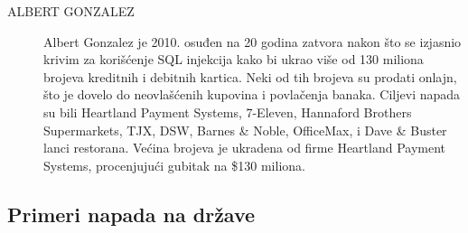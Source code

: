 \documentclass[a4paper]{article}
\theoremstyle{break}
\begin{document}
{\begin{description}
\item[ALBERT GONZALEZ] Albert Gonzalez je 2010. osuđen na 20 godina zatvora nakon što se izjasnio krivim za korišćenje SQL injekcija kako bi ukrao više od 130 miliona brojeva kreditnih i debitnih kartica. Neki od tih brojeva su prodati onlajn, što je dovelo do neovlašćenih kupovina i povlačenja banaka. Ciljevi napada su bili Heartland Payment Systems,  7-Eleven,  Hannaford Brothers Supermarkets,  TJX,  DSW,  Barnes \& Noble, OfficeMax, i Dave \& Buster lanci restorana. Većina brojeva je ukradena od firme Heartland Payment Systems, procenjujući gubitak na \$130 miliona.
\end{description}

\subsection{Primeri napada na države}
\label{subsec:primeri_napada_drzave}

}
\end{document}
